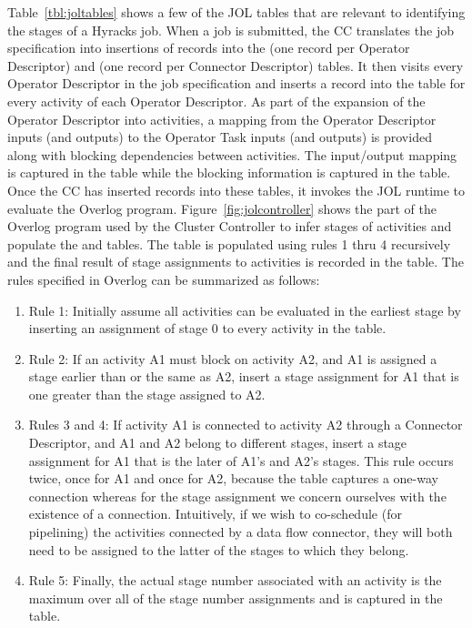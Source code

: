 Table~\ref{tbl:joltables} shows a few of the JOL tables that are relevant to identifying the stages of a Hyracks job. When a job is submitted, the CC translates the
job specification into insertions of records into the  (one record per Operator Descriptor) and  (one record per Connector
Descriptor) tables. It then visits every Operator Descriptor in the job specification and inserts a record into the  table for every activity of each Operator
Descriptor. As part of the expansion of the Operator Descriptor into activities, a mapping from the Operator Descriptor inputs (and outputs) to the Operator Task inputs (and
outputs) is provided along with blocking dependencies between activities. The input/output mapping is captured in the  table while the blocking information
is captured in the  table. Once the CC has inserted records into these tables, it invokes the JOL runtime to evaluate the Overlog program.
Figure~\ref{fig:jolcontroller} shows the part of the Overlog program used by the Cluster Controller to infer stages of activities and populate the  and
 tables. The  table is populated using rules 1 thru 4 recursively and the final result of stage assignments to activities is recorded
in the  table. The rules specified in Overlog can be summarized as follows:
\begin{enumerate}
\item Rule 1: Initially assume all activities can be evaluated in the earliest stage by inserting an assignment of stage 0 to every activity in the  table.
\item Rule 2: If an activity A1 must block on activity A2, and A1 is assigned a stage earlier than or the same as A2, insert a stage assignment for A1 that is one greater
than the stage assigned to A2.
\item Rules 3 and 4: If activity A1 is connected to activity A2 through a Connector Descriptor, and A1 and A2 belong to different stages, insert a stage assignment for A1 that
is the later of A1's and A2's stages. This rule occurs twice, once for A1 and once for A2, because the  table captures a one-way connection whereas
for the stage assignment we concern ourselves with the existence of a connection. Intuitively, if we wish to co-schedule (for pipelining) the activities connected by a data
flow connector, they will both need to be assigned to the latter of the stages to which they belong.
\item Rule 5: Finally, the actual stage number associated with an activity is the maximum over all of the stage number assignments and is captured in the  table.
\end{enumerate}

